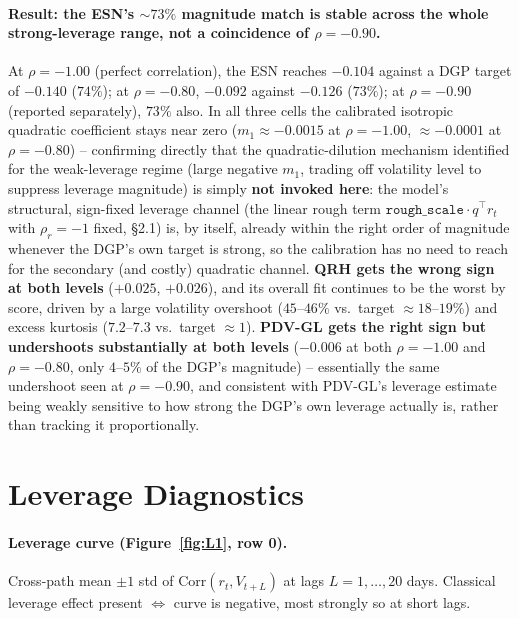\documentclass[11pt,a4paper]{article}
\begin{document}
\paragraph{Result: the ESN's $\sim73\%$ magnitude match is stable
across the whole strong-leverage range, not a coincidence of
$\rho=-0.90$.} At $\rho=-1.00$ (perfect correlation), the ESN reaches
$-0.104$ against a DGP target of $-0.140$ ($74\%$); at $\rho=-0.80$,
$-0.092$ against $-0.126$ ($73\%$); at $\rho=-0.90$ (reported
separately), $73\%$ also. In all three cells the calibrated isotropic
quadratic coefficient stays near zero ($m_1\approx-0.0015$ at
$\rho=-1.00$, $\approx-0.0001$ at $\rho=-0.80$) -- confirming directly
that the quadratic-dilution mechanism identified for the weak-leverage
regime (large negative $m_1$, trading off volatility level to
suppress leverage magnitude) is simply \textbf{not invoked here}: the
model's structural, sign-fixed leverage channel (the linear rough term
$\texttt{rough\_scale}\cdot q^\top r_t$ with $\rho_r=-1$ fixed,
\S2.1) is, by itself, already within the right order of magnitude
whenever the DGP's own target is strong, so the calibration has no
need to reach for the secondary (and costly) quadratic channel.
\textbf{QRH gets the wrong sign at both levels} ($+0.025$, $+0.026$),
and its overall fit continues to be the worst by score, driven by a
large volatility overshoot ($45$--$46\%$ vs.\ target $\approx18$--$19\%$)
and excess kurtosis ($7.2$--$7.3$ vs.\ target $\approx1$).
\textbf{PDV-GL gets the right sign but undershoots substantially at
both levels} ($-0.006$ at both $\rho=-1.00$ and $\rho=-0.80$, only
$4$--$5\%$ of the DGP's magnitude) -- essentially the same undershoot
seen at $\rho=-0.90$, and consistent with PDV-GL's leverage estimate
being weakly sensitive to how strong the DGP's own leverage actually
is, rather than tracking it proportionally.

\section{Leverage Diagnostics}

\paragraph{Leverage curve (Figure~\ref{fig:L1}, row 0).}
Cross-path mean $\pm1$ std of $\mathrm{Corr}(r_t,V_{t+L})$ at lags
$L=1,\ldots,20$ days. Classical leverage effect present
$\Leftrightarrow$ curve is negative, most strongly so at short lags.
\end{document}
